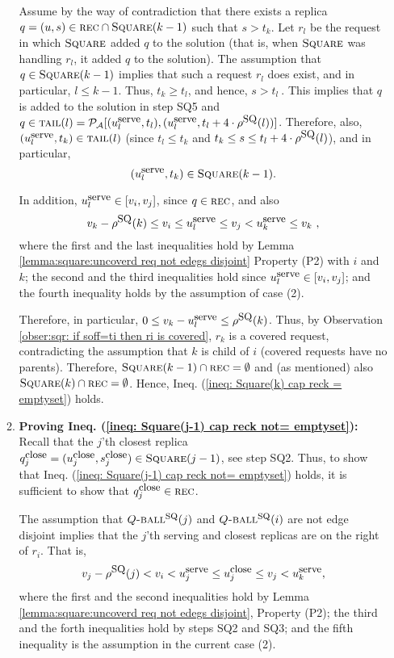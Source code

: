\documentclass[11pt]{article}
\newcommand{\calA}{\mathcal{A}}
\newcommand{\calP}{\mathcal{P}}
\newcommand{\Square}[0]{\mbox{\sc Square}}
\newcommand{\rep}[2]{(#1,#2)}
\newcommand{\uSQ}{u^{\mbox{\small\upshape serve}}}
\newcommand{\qclose}{q^{\mbox{\small\upshape close}}}
\newcommand{\uclose}{u^{\mbox{\small\upshape close}}}
\newcommand{\sclose}{s^{\mbox{\small\upshape close}}}
\newcommand{\tail}[0]{\mbox{\sc tail}}
\newcommand{\rhoSQ}[0]{\rho^{\mbox{\small\upshape SQ}}}
\newcommand{\reck}[0]{\mbox{\sc rec}}
\newcommand{\SQball}[0]{Q{\mbox{\sc -ball}}^{\mbox{\sc sq}}}
\begin{document}
\begin{enumerate}
\begin{enumerate}
Assume by the way of contradiction that there exists a replica $q=(u,s)\in\reck\cap\Square(k-1)$ such that $s > t_k$.
Let $r_l$ be the request in which $\Square$ added $q$ to the solution (that is, when $\Square$ was handling $r_l$, it added $q$ to the solution).
The assumption that $q\in\Square(k-1)$ implies that such a request $r_l$ does exist, and in particular, $l\leq k-1$.
Thus, $t_k\geq t_l$, and hence,
$s > t_l~.$
This implies that $q$ is added to the solution in step SQ5 and
$q\in\tail(l) = \calP_\calA[\rep{\uSQ_{l}}{t_{l}},\rep{\uSQ_{l}}{t_{l}+4\cdot\rhoSQ(l)}]$.
Therefore, also, $(\uSQ_{l},t_k)\in\tail(l)$ (since $t_{l}\leq t_k$ and $t_k\leq s\leq t_{l}+4\cdot\rhoSQ(l)$), and in particular,
$$(\uSQ_{l},t_k)\in \Square(k-1).$$


\vspace{0.5cm}


In addition, $\uSQ_{l}\in [v_i,v_j]$, since $q\in\reck$, and also
$$v_k-\rhoSQ(k)\leq v_i\leq \uSQ_{l}\leq v_j <\uSQ_k \leq v_k~,$$
where the first and the last inequalities hold by Lemma \ref{lemma:square:uncoverd req not edegs disjoint} Property (P2) with $i$ and $k$;
the second and the third inequalities hold since $\uSQ_{l}\in [v_i,v_j]$; and
the fourth inequality holds by the assumption of case (2).

\vspace{0.5cm}
Therefore, in particular, $0\leq v_k-\uSQ_l\leq \rhoSQ(k)$.
Thus, by Observation \ref{obser:sqr: if soff=ti then ri is covered}, $r_k$ is a covered request,
contradicting the assumption that $k$ is child of $i$ (covered requests have no parents).
Therefore, $\Square(k-1)\cap\reck=\emptyset$ and (as mentioned) also $\Square(k)\cap\reck=\emptyset$.
Hence, Ineq. (\ref{ineq: Square(k) cap reck = emptyset}) holds.



\vspace{0.5cm}
\item[]{\bf Proving Ineq. (\ref{ineq: Square(j-1) cap reck not= emptyset}):}
Recall that the $j$'th closest replica $\qclose_j=(\uclose_j,\sclose_j)\in \Square(j-1)$, see step SQ2.
Thus, to show that Ineq. (\ref{ineq: Square(j-1) cap reck not= emptyset}) holds, it is sufficient to show that $\qclose_j\in \reck$.


The assumption that $\SQball(j)$ and $\SQball(i)$ are not edge disjoint implies that the $j$'th serving and closest replicas are on the right of $r_i$.
That is,
\begin{eqnarray*}
v_j-\rhoSQ(j)<v_i<\uSQ_j\leq \uclose_j\leq v_j<\uSQ_k,
\end{eqnarray*}
where the first and the second inequalities hold by Lemma \ref{lemma:square:uncoverd req not edegs disjoint}, Property (P2);
the third and the forth inequalities hold by steps SQ2 and SQ3;
and the fifth inequality is the assumption in the current case (2).


\end{enumerate}
\end{enumerate}
\end{document}
